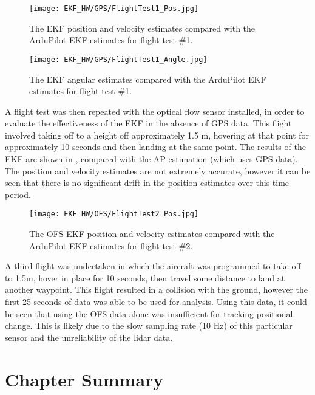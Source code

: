 \begin{figure}[htb]
	\texttt{[image: EKF\_HW/GPS/FlightTest1\_Pos.jpg]}%
	\caption{The EKF position and velocity estimates compared with the ArduPilot EKF estimates for flight test \#1.}%
	\label{fig:HW_GPS_Pos}%
\end{figure}

\begin{figure}[htb]
	\texttt{[image: EKF\_HW/GPS/FlightTest1\_Angle.jpg]}%
	\caption{The EKF angular estimates compared with the ArduPilot EKF estimates for flight test \#1.}%
	\label{fig:HW_GPS_Ang}%
\end{figure}

A flight test was then repeated with the optical flow sensor installed, in order to evaluate the effectiveness of the EKF in the absence of GPS data. This flight involved taking off to a height off approximately 1.5 m, hovering at that point for approximately 10 seconds and then landing at the same point. The results of the EKF are shown in , compared with the AP estimation (which uses GPS data). The position and velocity estimates are not extremely accurate, however it can be seen that there is no significant drift in the position estimates over this time period.

\begin{figure}[htb]
	\texttt{[image: EKF\_HW/OFS/FlightTest2\_Pos.jpg]}%
	\caption{The OFS EKF position and velocity estimates compared with the ArduPilot EKF estimates for flight test \#2.}%
	\label{fig:HW_OFS_Pos}%
\end{figure}

A third flight was undertaken in which the aircraft was programmed to take off to 1.5m, hover in place for 10 seconds, then travel some distance to land at another waypoint. This flight resulted in a collision with the ground, however the first 25 seconds of data was able to be used for analysis. Using this data, it could be seen that using the OFS data alone was insufficient for tracking positional change. This is likely due to the slow sampling rate (10 Hz) of this particular sensor and the unreliability of the lidar data.




\FloatBarrier
\section{Chapter Summary}

\clearpage


